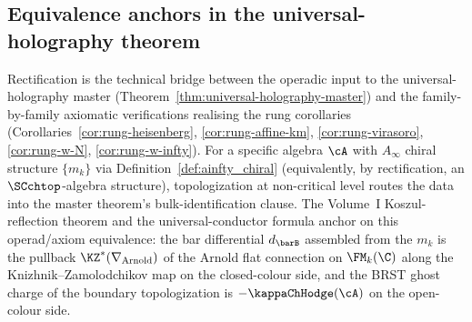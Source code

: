 \subsection{Equivalence anchors in the universal-holography theorem}
\label{subsec:equivalence-holography-anchors}

\begin{remark}
\label{rem:equivalence-holography-anchor}%
%
Rectification is the technical bridge between the operadic input
to the universal-holography master
(Theorem~\ref{thm:universal-holography-master}) and the
family-by-family axiomatic verifications realising the rung
corollaries (Corollaries~\ref{cor:rung-heisenberg},
\ref{cor:rung-affine-km}, \ref{cor:rung-virasoro},
\ref{cor:rung-w-N}, \ref{cor:rung-w-infty}). For a specific
algebra $\cA$ with $A_\infty$ chiral structure $\{m_k\}$ via
Definition~\ref{def:ainfty_chiral} (equivalently, by
rectification, an $\SCchtop$-algebra structure), topologization
at non-critical level routes the data into the master theorem's
bulk-identification clause. The Volume~I Koszul-reflection
theorem and the universal-conductor formula anchor on this
operad/axiom equivalence: the bar differential $d_{\barB}$
assembled from the $m_k$ is the pullback $\KZ^*(\nabla_{\mathrm{Arnold}})$
of the Arnold flat connection on $\FM_k(\C)$ along the
Knizhnik--Zamolodchikov map on the closed-colour side, and the
BRST ghost charge of the boundary topologization is
$-\kappaChHodge(\cA)$ on the open-colour side.
\end{remark}

